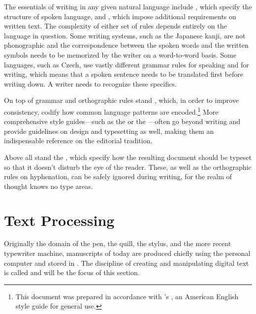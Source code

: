 \documentclass{book}
\begin{document}

The essentials of writing in any given natural language include , which specify the structure of spoken
language, and , which
impose additional requirements on written text. The complexity of either set of
rules depends entirely on the language in question. Some writing systems, such
as the Japanese kanji, are not phonographic and the correspondence between
the spoken words and the written symbols needs to be memorized by the writer on
a word-to-word basis. Some languages, such as Czech, use vastly different
grammar rules for speaking and for writing, which means that a spoken sentence
needs to be translated first before writing down. A writer needs to recognize
these specifics.

On top of grammar and orthographic rules stand , which, in
order to improve consistency, codify how common language patterns are
encoded.\footnote{
  This document was prepared in accordance with 's
  , an American English style guide for general use.
} More comprehensive style guides---such as the 
or the ---often go beyond writing and provide
guidelines on design and typesetting as well, making them an indispensable
reference on the editorial tradition.

Above all stand the ,
which specify how the resulting document should be typeset so that it doesn't
disturb the eye of the reader. These, as well as the orthographic rules on
hyphenation, can be safely ignored during writing, for the realm of thought
knows no type areas.


\section{Text Processing}
Originally the domain of the pen, the quill, the stylus, and the more recent
typewriter machine, manuscripts of today are produced chiefly using the personal
computer and stored in . The discipline of creating and
manipulating digital text is called  and will be the focus
of this section.
\end{document}
